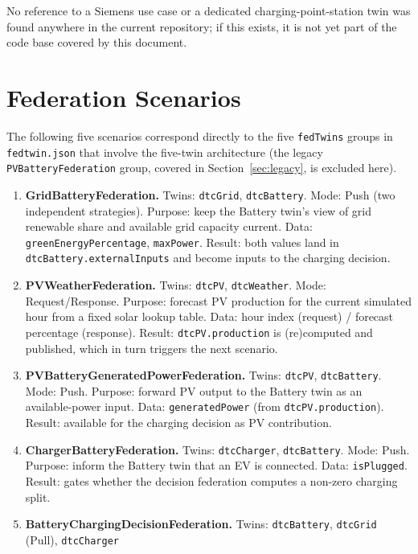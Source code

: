 \documentclass[11pt]{article}
\renewcommand{\_}{\textunderscore\allowbreak}
\begin{document}
No reference to a Siemens use case or a dedicated charging-point-station
twin was found anywhere in the current repository; if this exists, it is not
yet part of the code base covered by this document.

\section{Federation Scenarios}

The following five scenarios correspond directly to the five
\texttt{fedTwins} groups in \texttt{fedtwin.json} that involve the five-twin
architecture (the legacy \texttt{PVBatteryFederation} group, covered in
Section~\ref{sec:legacy}, is excluded here).

\begin{enumerate}[leftmargin=*]
  \item \textbf{GridBatteryFederation.} Twins: \texttt{dtcGrid},
        \texttt{dtcBattery}. Mode: Push (two independent strategies).
        Purpose: keep the Battery twin's view of grid renewable share and
        available grid capacity current. Data: \texttt{greenEnergyPercentage},
        \texttt{maxPower}. Result: both values land in
        \texttt{dtcBattery.externalInputs} and become inputs to the
        charging decision.
  \item \textbf{PVWeatherFederation.} Twins: \texttt{dtcPV},
        \texttt{dtcWeather}. Mode: Request/Response. Purpose: forecast PV
        production for the current simulated hour from a fixed solar
        lookup table. Data: hour index (request) / forecast percentage
        (response). Result: \texttt{dtcPV.production} is (re)computed and
        published, which in turn triggers the next scenario.
  \item \textbf{PVBatteryGeneratedPowerFederation.} Twins: \texttt{dtcPV},
        \texttt{dtcBattery}. Mode: Push. Purpose: forward PV output to the
        Battery twin as an available-power input. Data:
        \texttt{generatedPower} (from \texttt{dtcPV.production}). Result:
        available for the charging decision as PV contribution.
  \item \textbf{ChargerBatteryFederation.} Twins: \texttt{dtcCharger},
        \texttt{dtcBattery}. Mode: Push. Purpose: inform the Battery twin
        that an EV is connected. Data: \texttt{isPlugged}. Result: gates
        whether the decision federation computes a non-zero charging split.
  \item \textbf{BatteryChargingDecisionFederation.} Twins:
        \texttt{dtcBattery}, \texttt{dtcGrid} (Pull), \texttt{dtcCharger}

\end{enumerate}
\end{document}
